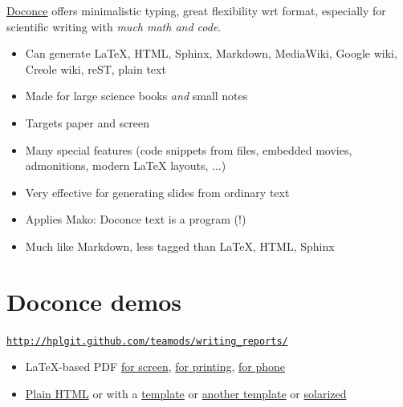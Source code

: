 \documentclass[%
twoside,                 %
draft,                   %
final,                   %
chapterprefix=true,      %
open=right               %
10pt]{book}
\newcounter{doconce:movie:counter}
\newcounter{doconce:exercise:counter}
\begin{document}
\begin{shadedquoteBlue}
\href{{http://hplgit.github.io/doconce/doc/web/index.html}}{Doconce}
offers minimalistic typing, great flexibility wrt format,
especially for scientific writing with \emph{much math and code}.

\begin{itemize}
 \item Can generate {\LaTeX}, HTML, Sphinx, Markdown, MediaWiki, Google wiki,
   Creole wiki, reST, plain text

 \item Made for large science books \emph{and} small notes

 \item Targets paper and screen

 \item Many special features (code snippets from files, embedded movies,
   admonitions, modern {\LaTeX} layouts, ...)

 \item Very effective for generating slides from ordinary text

 \item Applies Mako: Doconce text is a program (!)

 \item Much like Markdown, less tagged than {\LaTeX}, HTML, Sphinx
\end{itemize}

\noindent
\section*{Doconce demos}

\href{{http://hplgit.github.com/teamods/writing_reports/}}{\nolinkurl{http://hplgit.github.com/teamods/writing_reports/}}

\begin{itemize}
 \item LaTeX-based PDF \href{{http://hplgit.github.com/teamods/writing_reports/_static/report.pdf}}{for screen}, \href{{http://hplgit.github.com/teamods/writing_reports/_static/report_4printing.pdf}}{for printing}, \href{{http://hplgit.github.com/teamods/writing_reports/_static/report_4phone.pdf}}{for phone}

 \item \href{{http://hplgit.github.com/teamods/writing_reports/_static/report_do.html}}{Plain HTML} or with a \href{{http://hplgit.github.com/teamods/writing_reports/_static/report_vagrant.html}}{template} or \href{{http://hplgit.github.com/teamods/writing_reports/_static/report_github_minimal.html}}{another template} or \href{{http://hplgit.github.com/teamods/writing_reports/_static/report_solarized.html}}{solarized}


\end{itemize}
\end{shadedquoteBlue}
\end{document}
